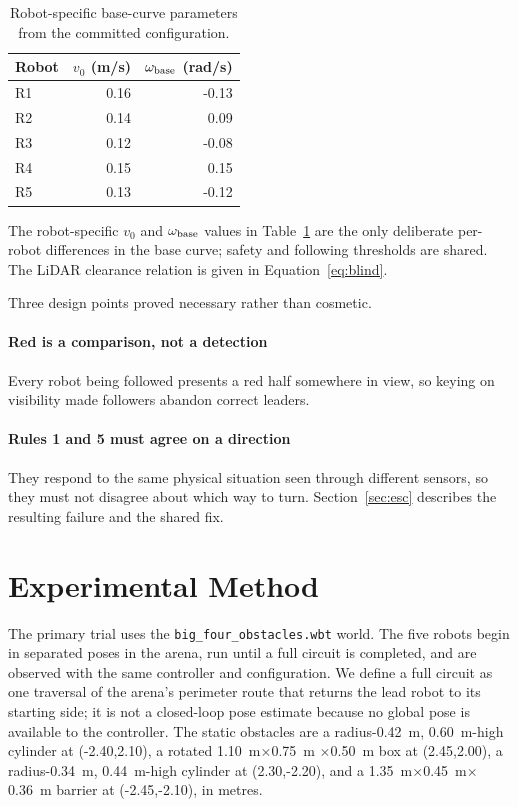 \documentclass[conference,a4paper]{IEEEtran}
\begin{document}
\begin{table}[t]
\caption{Robot-specific base-curve parameters from the committed
configuration.}
\label{tab:base}
\centering
\footnotesize
\begin{tabular}{@{}lrr@{}}
\toprule
Robot & $v_0$ (m/s) & $\omega_{\rm base}$ (rad/s) \\
\midrule
R1 & 0.16 & -0.13 \\
R2 & 0.14 &  0.09 \\
R3 & 0.12 & -0.08 \\
R4 & 0.15 &  0.15 \\
R5 & 0.13 & -0.12 \\
\bottomrule
\end{tabular}
\end{table}

The robot-specific $v_0$ and $\omega_{\rm base}$ values in Table~\ref{tab:base}
are the only deliberate per-robot differences in the base curve; safety and
following thresholds are shared. The LiDAR clearance relation is given in
Equation~\ref{eq:blind}.

Three design points proved necessary rather than cosmetic.

\paragraph{Red is a comparison, not a detection}
Every robot being followed presents a red half somewhere in view, so keying on
visibility made followers abandon correct leaders.

\paragraph{Rules 1 and 5 must agree on a direction}
They respond to the same physical situation seen through different sensors,
so they must not disagree about which way to turn. Section~\ref{sec:esc}
describes the resulting failure and the shared fix.

\section{Experimental Method}
\label{sec:method}
The primary trial uses the \texttt{big\_four\_obstacles.wbt} world. The five
robots begin in separated poses in the arena, run until a full circuit is
completed, and are observed with the same controller and configuration. We
define a full circuit as one traversal of the arena's perimeter route that
returns the lead robot to its starting side; it is not a closed-loop pose
estimate because no global pose is available to the controller. The static
obstacles are a radius-\SI{0.42}{\metre}, \SI{0.60}{\metre}-high cylinder at
(-2.40,2.10), a rotated \SI{1.10}{\metre}$\times$\SI{0.75}{\metre}
$\times$\SI{0.50}{\metre} box at (2.45,2.00), a radius-\SI{0.34}{\metre},
\SI{0.44}{\metre}-high cylinder at (2.30,-2.20), and a
\SI{1.35}{\metre}$\times$\SI{0.45}{\metre}$\times$\SI{0.36}{\metre} barrier
at (-2.45,-2.10), in metres.
\end{document}
